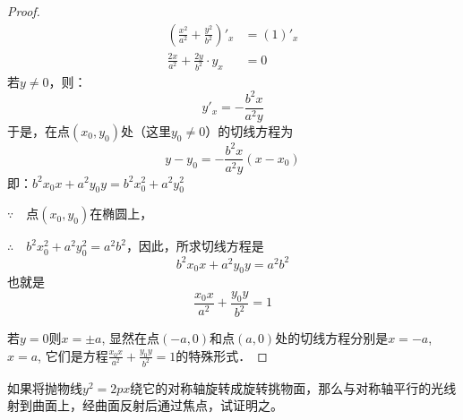 \begin{proof}
\[\begin{split}
    \left(\frac{x^2}{a^2}+\frac{y^2}{b^2}\right)'_x&=(1)'_x\\
    \frac{2x}{a^2}+\frac{2y}{b^2}\cdot y_x&=0
\end{split}\]
若$y\ne 0$，则：
\[y'_x=-\frac{b^2x}{a^2y}\]
于是，在点$(x_0,y_0)$处（这里$y_0\ne 0$）的切线方程为
\[y-y_0=-\frac{b^2x}{a^2y}(x-x_0)\]
即：$b^2x_0x+a^2y_0y=b^2x^2_0+a^2y^2_0$

$\because\quad $点$(x_0,y_0)$在椭圆上，

$\therefore\quad b^2x_0^2+a^2y^2_0=a^2b^2$，因此，所求切线方程是
\[b^2x_0 x+a^2y_0 y=a^2b^2\]
也就是
\[\frac{x_0x}{a^2}+\frac{y_0y}{b^2}=1\]

若$y=0$则$x=\pm a$, 显然在点$(-a,0)$和点$(a,0)$处的切线方程分别是$x=-a$, $x=a$, 它们是方程$\frac{x_0x}{a^2}+\frac{y_0y}{b^2}=1$的特殊形式．
\end{proof}
    
\begin{example}
    如果将抛物线$y^2=2px$绕它的对称轴旋转成旋转挑物面，那么与对称轴平行的光线射到曲面上，经曲面反射后通过焦点，试证明之。
\end{example}


